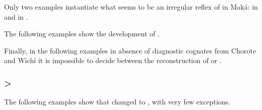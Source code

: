 Only two examples instantiate what seems to be an irregular reflex of  in Maká:  in  and  in .

\begin{exe}
    \ex \newadj \label{mk-a-newadj}
    \ex \hornero \label{mk-a-hornero}
\end{exe}

The following examples show the development of .

\begin{exe}
    \ex \wing
    \ex \goawaycisl
    \ex \putv
    \ex \tell
    \ex \sisinlaw
    \ex \soninlaw
    \ex \rootn
    \ex \stretchout
    \ex \dividev
    \ex \chaniart
    \ex \flu
    \ex \hither
    \ex \smellv
    \ex \abdcavity
    \ex \cat
    \ex \allrcpr
    \ex \walk
    \ex \seev
    \ex \placen
    \ex \eatvi
    \ex \queenpalmf
    \ex \meat
\end{exe}

Finally, in the following examples in absence of diagnostic cognates from Chorote and Wichí it is impossible to decide between the reconstruction of  or .

\begin{exe}
    \ex \burnalh
    \ex \foodmn
    \ex \locustmn
    \ex \ameiva
    \ex \obey
    \ex \smooth
    \ex \agile
    \ex \hookmn
    \ex \dwarf
    \ex \leafmn
    \ex \vertical
    \ex \tsaqaq
    \ex \tireddie
    \ex \mollef
\end{exe}

\subsubsection{ > } \label{mk-ao-a}

The following examples show that  changed to , with very few exceptions.

\begin{exe}
    \ex \spin
    \ex \gofirst
    \ex \goawayi
    \ex \arrive
    \ex \shout
    \ex \stinger
    \ex \cryao
    \ex \returnth
    \ex \food
    \ex \son
    \ex \daughter
    \ex \bleedv
    \ex \spillmn
    \ex \tobacco
    \ex \welln
    \ex \drinkv
    \ex \truev
    \ex \ocelot
    \ex \cactus
    \ex \arrowkaxe
    \ex \youngersis
    \ex \killv
    \ex \willow
    \ex {}
    \ex \lightfire
    \ex \sleep
    \ex \goimp
    \ex \rope
    \ex \cavy
    \ex \lip
    \ex \up
    \ex \fishwithhook
    \ex \cicada
    \ex \vein
    \ex \spank
    \ex \siyaj
    \ex \sprout
    \ex \soundv
    \ex \shoot
    \ex \woodpecker
    \ex \chaja
    \ex \tired
    \ex \badmood
    \ex \piranhamn
    \ex \skymn
    \ex \cloudmn
    \ex \rhea
    \ex \bat
    \ex \orphanmn
    \ex \mollef
    \ex \hurt
    \ex \wildbean
    \ex \wildpepper
    \ex \skin
    \ex \teach
\end{exe}


